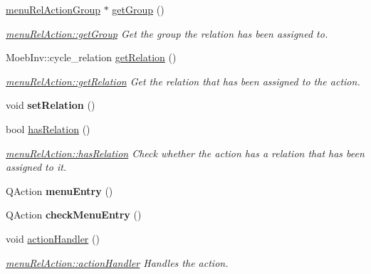 \begin{DoxyCompactItemize}
\mbox{\hyperlink{classmenu_rel_action_group}{menu\+Rel\+Action\+Group}} $\ast$ \mbox{\hyperlink{classmenu_rel_action_aca0baeed9c6a266d677dae8dfb25d65b}{get\+Group}} ()
\begin{DoxyCompactList}\small\item\em \mbox{\hyperlink{classmenu_rel_action_aca0baeed9c6a266d677dae8dfb25d65b}{menu\+Rel\+Action\+::get\+Group}} Get the group the relation has been assigned to. \end{DoxyCompactList}\item 
Moeb\+Inv\+::cycle\+\_\+relation \mbox{\hyperlink{classmenu_rel_action_a34deae132c511b7e34af97585df9245c}{get\+Relation}} ()
\begin{DoxyCompactList}\small\item\em \mbox{\hyperlink{classmenu_rel_action_a34deae132c511b7e34af97585df9245c}{menu\+Rel\+Action\+::get\+Relation}} Get the relation that has been assigned to the action. \end{DoxyCompactList}\item 
\mbox{\label{classmenu_rel_action_acba36fb50f54a72a4b253957f2f50f92}} 
void {\bfseries set\+Relation} ()
\item 
bool \mbox{\hyperlink{classmenu_rel_action_a5e6339dbaf4cf0dc9543afdfc5b9e15a}{has\+Relation}} ()
\begin{DoxyCompactList}\small\item\em \mbox{\hyperlink{classmenu_rel_action_a5e6339dbaf4cf0dc9543afdfc5b9e15a}{menu\+Rel\+Action\+::has\+Relation}} Check whether the action has a relation that has been assigned to it. \end{DoxyCompactList}\item 
\mbox{\label{classmenu_rel_action_af3463f9fd28cf1ff44c672dedb89af95}} 
Q\+Action {\bfseries menu\+Entry} ()
\item 
\mbox{\label{classmenu_rel_action_a9c40a2e1e1538829214a2a9e06896a99}} 
Q\+Action {\bfseries check\+Menu\+Entry} ()
\item 
void \mbox{\hyperlink{classmenu_rel_action_a23b63e5bdb79e12f74bd1d33a53fb6e0}{action\+Handler}} ()
\begin{DoxyCompactList}\small\item\em \mbox{\hyperlink{classmenu_rel_action_a23b63e5bdb79e12f74bd1d33a53fb6e0}{menu\+Rel\+Action\+::action\+Handler}} Handles the action. \end{DoxyCompactList}\item 

\end{DoxyCompactItemize}
